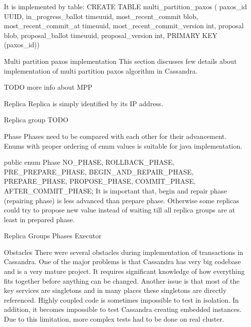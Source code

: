 It is implemented by table:
CREATE TABLE multi_partition_paxos (
paxos_id UUID,
in_progress_ballot timeuuid,
most_recent_commit blob,
most_recent_commit_at timeuuid,
most_recent_commit_version int,
proposal blob,
proposal_ballot timeuuid,
proposal_version int,
PRIMARY KEY (paxos_id))




Multi partition paxos implementation
This section discusses few details about implementation of multi partition paxos algorithm in Cassandra.


TODO more info about MPP


Replica
Replica is simply identified by its IP address. 


Replica group
TODO


Phase
Phases need to be compared with each other for their advancement. Enums with proper ordering of enum values is suitable for java implementation.


public enum Phase
{
   NO_PHASE,
   ROLLBACK_PHASE,
   PRE_PREPARE_PHASE,
   BEGIN_AND_REPAIR_PHASE,
   PREPARE_PHASE,
   PROPOSE_PHASE,
   COMMIT_PHASE,
   AFTER_COMMIT_PHASE;
}
It is important that, begin and repair phase (repairing phase) is less advanced than prepare phase. Otherwise some replicas could try to propose new value instead of waiting till all replica groups are at least in prepared phase.


Replica Groups Phases Executor






Obstacles
There were several obstacles during implementation of transactions in Cassandra. One of the major problems is that Cassandra has very big codebase and is a very mature project. It requires significant knowledge of how everything fits together before anything can be changed. 
Another issue is that most of the key services are singletons and in many places these singletons are directly referenced. Highly coupled code is sometimes impossible to test in isolation. In addition, it becomes impossible to test Cassandra creating embedded instances. Due to this limitation, more complex tests had to be done on real cluster.

